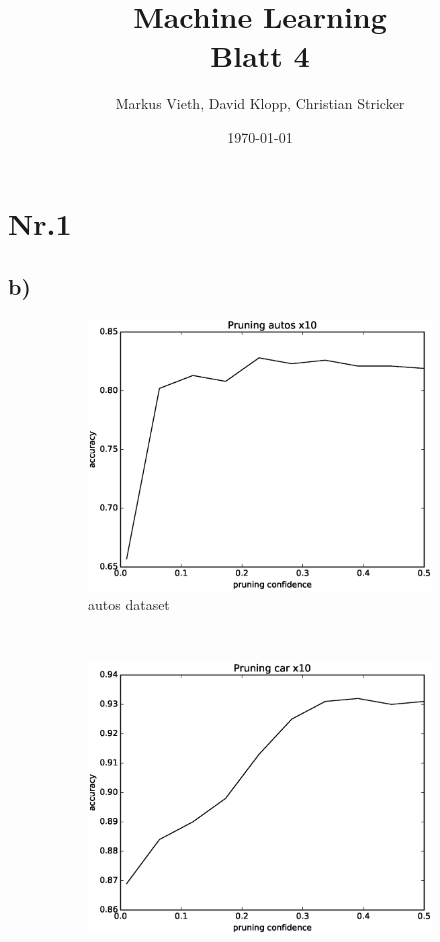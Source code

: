 \documentclass[a4paper,11pt,twoside]{article}
\title{Machine Learning\\ Blatt 4}
\author{Markus Vieth, David Klopp, Christian Stricker}
\date{\today}
\begin{document}
\newcommand{\cor}[1]{\textcolor{red}{\textit{#1}}}
\maketitle
\cleardoublepage
\pagestyle{myheadings}

\newpage

\section*{Nr.1}
\subsection*{b)}
\begin{figure}[h]
	\captionsetup[subfigure]{labelformat=empty}
	\centering
	\begin{subfigure}[t]{0.33\textwidth}
		\includegraphics[width=\textwidth]{img/autos.eps}
		\caption{autos dataset}
	\end{subfigure}%
	~
	\begin{subfigure}[t]{0.33\textwidth}
		\includegraphics[width=\textwidth]{img/car}

\end{subfigure}
\end{figure}
\end{document}
